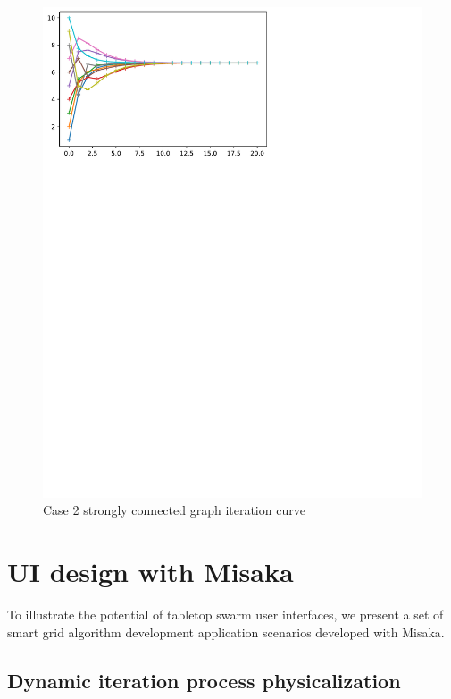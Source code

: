 \documentclass[conference]{IEEEtran}
\begin{document}
\begin{figure}[htbp]
    \centering
    \includegraphics[width=\columnwidth]{123456-Correct.pdf}
    \caption{Case 2 strongly connected graph iteration curve}
    \label{fig:123456-Correct}
\end{figure}






\section{UI design with Misaka}

To illustrate the potential of tabletop swarm user interfaces, we present a set of smart grid algorithm development application scenarios developed with Misaka.

\subsection{Dynamic iteration process physicalization}
\end{document}

